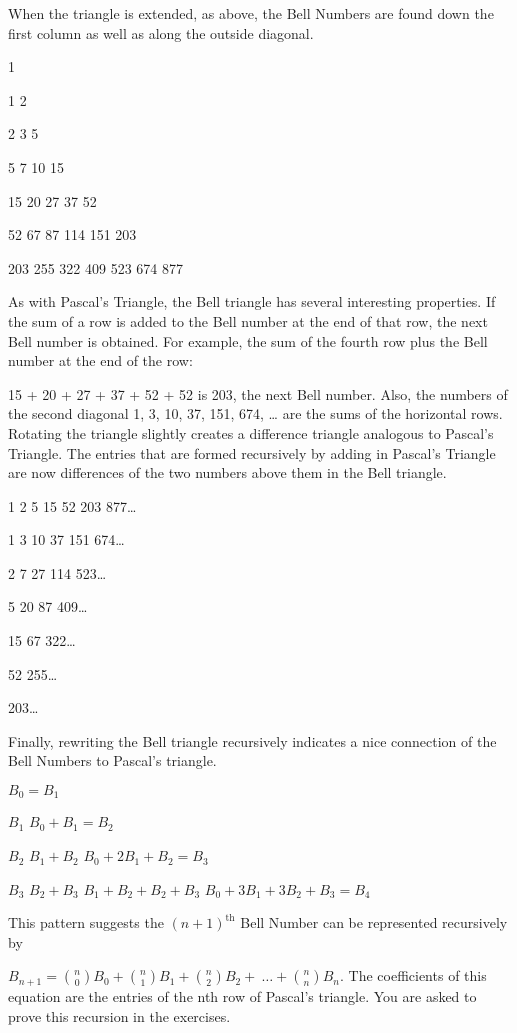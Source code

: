 \documentclass[10pt,letter]{article}
\begin{document}
When the triangle is extended, as above, the Bell Numbers are found down
the first column as well as along the outside diagonal.

1

1 2

2 3 5

5 7 10 15

15 20 27 37 52

52 67 87 114 151 203

203 255 322 409 523 674 877

As with Pascal's Triangle, the Bell triangle has several interesting
properties. If the sum of a row is added to the Bell number at the end
of that row, the next Bell number is obtained. For example, the sum of
the fourth row plus the Bell number at the end of the row:

15 + 20 + 27 + 37 + 52 + 52 is 203, the next Bell number. Also, the
numbers of the second diagonal 1, 3, 10, 37, 151, 674, \ldots{} are the
sums of the horizontal rows. Rotating the triangle slightly creates a
difference triangle analogous to Pascal's Triangle. The entries that are
formed recursively by adding in Pascal's Triangle are now differences of
the two numbers above them in the Bell triangle.

1 2 5 15 52 203 877\ldots{}

1 3 10 37 151 674\ldots{}

2 7 27 114 523\ldots{}

5 20 87 409\ldots{}

15 67 322\ldots{}

52 255\ldots{}

203\ldots{}

Finally, rewriting the Bell triangle recursively indicates a nice
connection of the Bell Numbers to Pascal's triangle.

\(B_{0} = B_{1}\)

\(B_{1}\) \(B_{0} + B_{1} = B_{2}\)

\(B_{2}\) \(B_{1} + B_{2}\) \(B_{0} + 2B_{1} + B_{2} = B_{3}\)

\(B_{3}\) \(B_{2} + B_{3}\) \(B_{1} + B_{2} + B_{2} + B_{3}\)
\(B_{0} + 3B_{1} + 3B_{2} + B_{3} = B_{4}\)

This pattern suggests the \({(n + 1)}^{\text{th}}\) Bell Number can be
represented recursively by

\(B_{n + 1} =
\binom{n}{0}
B_{0} +
\binom{n}{1}
B_{1} +
\binom{n}{2}
B_{2} + \ \ldots +
\binom{n}{n}
B_{n}\). The coefficients of this equation are the entries
of the nth row of Pascal's triangle. You are asked to prove this
recursion in the exercises.
\end{document}
